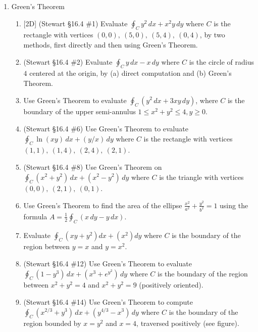 \documentclass[12pt]{article}
\newcommand{\dimtag}[1]{{\footnotesize\textsc{[#1]}}\;}
\begin{document}
\begin{enumerate}
\item Green's Theorem
    \begin{enumerate}
        \item \dimtag{2D} (Stewart \S16.4 \#1) Evaluate $\oint_C y^2\,dx + x^2 y\,dy$ where $C$ is the rectangle with vertices $(0,0),\ (5,0),\ (5,4),\ (0,4)$, by two methods, first directly and then using Green's Theorem.
        \item (Stewart \S16.4 \#2) Evaluate $\oint_C y\,dx - x\,dy$ where $C$ is the circle of radius $4$ centered at the origin, by (a) direct computation and (b) Green's Theorem.
        \item Use Green's Theorem to evaluate $\oint_{C} (y^2 \, dx + 3xy \, dy)$, where $C$ is the boundary of the upper semi-annulus $1 \leq x^2 + y^2 \leq 4, y \geq 0$.
        \item (Stewart \S16.4 \#6) Use Green's Theorem to evaluate $\oint_C \ln(xy)\,dx + (y/x)\,dy$ where $C$ is the rectangle with vertices $(1,1),\ (1,4),\ (2,4),\ (2,1)$.
        \item (Stewart \S16.4 \#8) Use Green's Theorem on $\oint_C (x^2 + y^2)\,dx + (x^2 - y^2)\,dy$ where $C$ is the triangle with vertices $(0,0),\ (2,1),\ (0,1)$.
        \item Use Green's Theorem to find the area of the ellipse $\frac{x^2}{a^2} + \frac{y^2}{b^2} = 1$ using the formula $A = \frac{1}{2} \oint_{C} (x \, dy - y \, dx)$.
        \item Evaluate $\oint_C (xy + y^2)dx + (x^2)dy$ where $C$ is the boundary of the region between $y=x$ and $y=x^2$.
        \item (Stewart \S16.4 \#12) Use Green's Theorem to evaluate $\oint_C (1 - y^3)\,dx + (x^3 + e^{y^2})\,dy$ where $C$ is the boundary of the region between $x^2 + y^2 = 4$ and $x^2 + y^2 = 9$ (positively oriented).
        \item (Stewart \S16.4 \#14) Use Green's Theorem to compute $\oint_C (x^{2/3} + y^3)\,dx + (y^{4/3} - x^3)\,dy$ where $C$ is the boundary of the region bounded by $x = y^2$ and $x = 4$, traversed positively (see figure).
        \begin{center}
\end{center}
\end{enumerate}
\end{enumerate}
\end{document}
